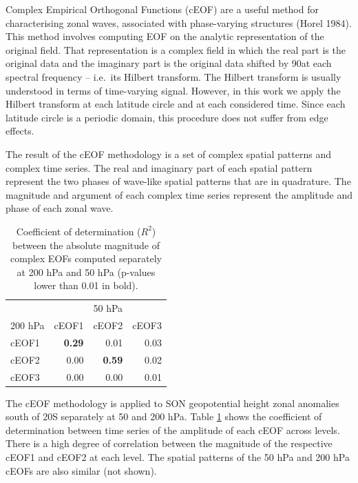 \documentclass[smallextended]{svjour3}       %
\begin{document}
Complex Empirical Orthogonal Functions (cEOF) are a useful method for characterising zonal waves, associated with phase-varying structures (Horel 1984).
This method involves computing EOF on the analytic representation of the original field.
That representation is a complex field in which the real part is the original data and the imaginary part is the original data shifted by 90\degree at each spectral frequency -- i.e.~its Hilbert transform.
The Hilbert transform is usually understood in terms of time-varying signal.
However, in this work we apply the Hilbert transform at each latitude circle and at each considered time.
Since each latitude circle is a periodic domain, this procedure does not suffer from edge effects.

The result of the cEOF methodology is a set of complex spatial patterns and complex time series.
The real and imaginary part of each spatial pattern represent the two phases of wave-like spatial patterns that are in quadrature.
The magnitude and argument of each complex time series represent the amplitude and phase of each zonal wave.



\begin{table}

\caption{\label{tab:corr-ceof-splitted}Coefficient of determination (\(R^2\)) between the absolute magnitude of complex EOFs computed separately at 200 hPa and 50 hPa (p-values lower than 0.01 in bold).}
\centering
\begin{tabular}[t]{l>{}r>{}r>{}r}
\toprule
\multicolumn{1}{c}{} & \multicolumn{3}{c}{50 hPa} \\
\cmidrule(l{3pt}r{3pt}){2-4}
200 hPa & cEOF1 & cEOF2 & cEOF3\\
\midrule
cEOF1 & \textbf{0.29} & 0.01 & 0.03\\
cEOF2 & 0.00 & \textbf{0.59} & 0.02\\
cEOF3 & 0.00 & 0.00 & 0.01\\
\bottomrule
\end{tabular}
\end{table}

The cEOF methodology is applied to SON geopotential height zonal anomalies south of 20\degree S separately at 50 and 200 hPa.
Table \ref{tab:corr-ceof-splitted} shows the coefficient of determination between time series of the amplitude of each cEOF across levels.
There is a high degree of correlation between the magnitude of the respective cEOF1 and cEOF2 at each level.
The spatial patterns of the 50 hPa and 200 hPa cEOFs are also similar (not shown).
\end{document}
